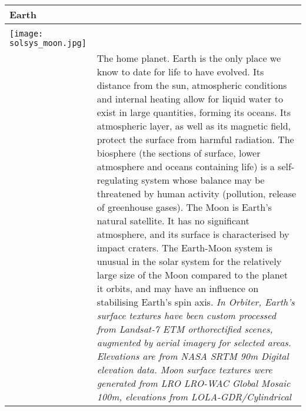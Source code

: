 \documentclass[Orbiter User Manual.tex]{subfiles}
\begin{document}
\begin{table}[H]
	\begin{tabularx}{\textwidth}{ |lX| }
	\hline\rule{0pt}{2ex}
	\textbf{Earth} &\\
	\hline\rule{0pt}{2ex}
	\adjustbox{valign=t}{
		\begin{tabular}{ c }
		\texttt{[image: solsys\_earth.jpg]}\\
		\texttt{[image: solsys\_moon.jpg]}\\
		\end{tabular}
		}
	& \vfill
	The home planet. Earth is the only place we know to date for life to have evolved. Its distance from the sun, atmospheric conditions and internal heating allow for liquid water to exist in large quantities, forming its oceans. Its atmospheric layer, as well as its magnetic field, protect the surface from harmful radiation. The bio­sphere (the sections of surface, lower atmosphere and oceans containing life) is a self-regulating system whose balance may be threatened by human activity (pollution, release of greenhouse gases).\newline
	The Moon is Earth's natural satellite. It has no significant atmosphere, and its surface is characterised by impact craters. The Earth-Moon system is unusual in the solar system for the relatively large size of the Moon compared to the planet it orbits, and may have an influence on stabilising Earth's spin axis.\newline
	\newline
	\textit{In Orbiter, Earth's surface textures have been custom processed from Landsat-7 ETM orthorectified scenes, augmented by aerial imagery for selected areas. Elevations are from NASA SRTM 90m Digital elevation data. Moon surface textures were generated from LRO LRO-WAC Global Mosaic 100m, elevations from LOLA-GDR/Cylindrical}\\
	\hline
	\end{tabularx}
\end{table}
\end{document}
